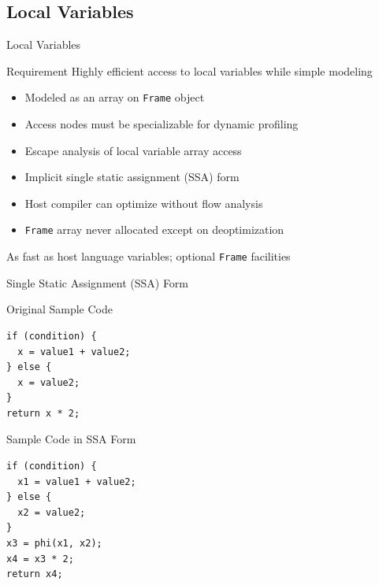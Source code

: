 \documentclass[xcolor=dvipsname,handout]{beamer}
\begin{document}
\subsection{Local Variables}
\begin{frame}{Local Variables}
    \begin{alertblock}{Requirement}
        Highly efficient access to local variables while simple modeling
        \begin{itemize}
          \item Modeled as an array on \texttt{Frame} object
          \item Access nodes must be specializable for dynamic profiling
        \end{itemize}
    \end{alertblock}
    \pause
    \vfill
    \begin{itemize}
        \item Escape analysis of local variable array access
        \pause
        \item Implicit single static assignment (SSA) form
        \pause
        \item Host compiler can optimize without flow analysis
        \pause
        \item \texttt{Frame} array never allocated except on deoptimization
    \end{itemize}
    \pause
    \begin{center}
        \alert{As fast as host language variables; optional  \texttt{Frame} facilities}
    \end{center}
\end{frame}

\begin{frame}[fragile]{Single Static Assignment (SSA) Form}
  \begin{block}{Original Sample Code}
  \begin{lstlisting}
if (condition) {
  x = value1 + value2;
} else {
  x = value2;
}
return x * 2;
  \end{lstlisting}
  \end{block}
  \pause
  \begin{block}{Sample Code in SSA Form}
  \begin{lstlisting}
if (condition) {
  x1 = value1 + value2;
} else {
  x2 = value2;
}
x3 = phi(x1, x2);
x4 = x3 * 2;
return x4;
  \end{lstlisting}
  \end{block}
\end{frame}
\end{document}
